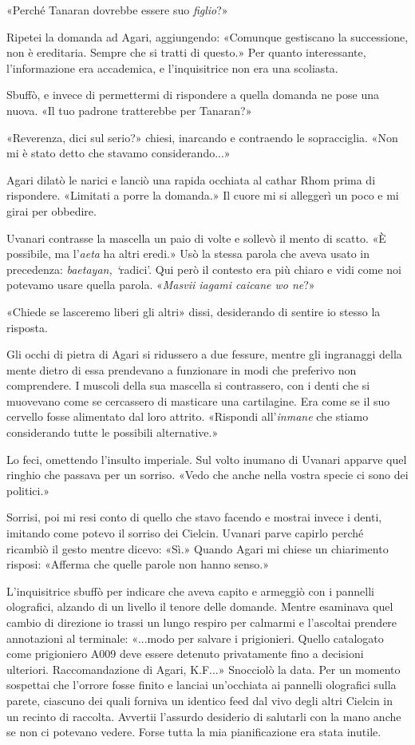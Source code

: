 «Perché Tanaran dovrebbe essere suo \emph{figlio}?»

Ripetei la domanda ad Agari, aggiungendo: «Comunque gestiscano la
successione, non è ereditaria. Sempre che si tratti di questo.» Per
quanto interessante, l'informazione era accademica, e l'inquisitrice non
era una scoliasta.

Sbuffò, e invece di permettermi di rispondere a quella domanda ne pose
una nuova. «Il tuo padrone tratterebbe per Tanaran?»

«Reverenza, dici sul serio?» chiesi, inarcando e contraendo le
sopracciglia. «Non mi è stato detto che stavamo considerando...»

Agari dilatò le narici e lanciò una rapida occhiata al cathar Rhom prima
di rispondere. «Limitati a porre la domanda.» Il cuore mi si alleggerì
un poco e mi girai per obbedire.

Uvanari contrasse la mascella un paio di volte e sollevò il mento di
scatto. «È possibile, ma l'\emph{aeta} ha altri eredi.» Usò la stessa
parola che aveva usato in precedenza: \emph{baetayan, `}radici'. Qui
però il contesto era più chiaro e vidi come noi potevamo usare quella
parola. «\emph{Masvii iagami caicane wo ne}?»

«Chiede se lasceremo liberi gli altri» dissi, desiderando di sentire io
stesso la risposta.

Gli occhi di pietra di Agari si ridussero a due fessure, mentre gli
ingranaggi della mente dietro di essa prendevano a funzionare in modi
che preferivo non comprendere. I muscoli della sua mascella si
contrassero, con i denti che si muovevano come se cercassero di
masticare una cartilagine. Era come se il suo cervello fosse alimentato
dal loro attrito. «Rispondi all'\emph{inmane} che stiamo considerando
tutte le possibili alternative.»

Lo feci, omettendo l'insulto imperiale. Sul volto inumano di {Uvanari}
apparve quel ringhio che passava per un sorriso. «Vedo che anche nella
vostra specie ci sono dei politici.»

Sorrisi, poi mi resi conto di quello che stavo facendo e mostrai invece
i denti, imitando come potevo il sorriso dei Cielcin. Uvanari parve
capirlo perché ricambiò il gesto mentre dicevo: «Sì.» Quando Agari mi
chiese un chiarimento risposi: «Afferma che quelle parole non hanno
senso.»

L'inquisitrice sbuffò per indicare che aveva capito e armeggiò con i
pannelli olografici, alzando di un livello il tenore delle domande.
Mentre esaminava quel cambio di direzione io trassi un lungo respiro per
calmarmi e l'ascoltai prendere annotazioni al terminale: «...modo per
salvare i prigionieri. Quello catalogato come prigioniero A009 deve
essere detenuto privatamente fino a decisioni ulteriori. Raccomandazione
di Agari, K.F...» Snocciolò la data. Per un momento sospettai che
l'orrore fosse finito e lanciai un'occhiata ai pannelli olografici sulla
parete, ciascuno dei quali forniva un identico feed dal vivo degli altri
Cielcin in un recinto di raccolta. Avvertii l'assurdo desiderio di
salutarli con la mano anche se non ci potevano vedere. Forse tutta la
mia pianificazione era stata inutile.

